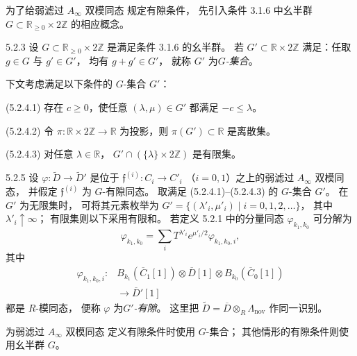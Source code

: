 为了给弱滤过 $A_\infty$ 双模同态
规定有隙条件，
先引入条件 3.1.6 中幺半群
$G\subset\mathbb R_{\geq0}\times2\mathbb Z$
的相应概念。

\begin{definition}{5.2.3}\label{def:5-2-3}
设 $G\subset\mathbb R_{\geq0}\times2\mathbb Z$
是满足条件 3.1.6 的幺半群。
若 $G'\subset\mathbb R\times2\mathbb Z$
满足：任取 $g\in G$ 与 $g'\in G'$，
均有 $g+g'\in G'$，
就称 $G'$ 为\emph{$G$-集合}。
\end{definition}

下文考虑满足以下条件的 $G$-集合 $G'$：
\par\noindent\textup{(5.2.4.1)}\quad
存在 $c\geq0$，使任意
$(\lambda,\mu)\in G'$ 都满足 $-c\leq\lambda$。
\par\noindent\textup{(5.2.4.2)}\quad
令 $\pi:\mathbb R\times2\mathbb Z\to\mathbb R$
为投影，则 $\pi(G')\subset\mathbb R$ 是离散集。
\par\noindent\textup{(5.2.4.3)}\quad
对任意 $\lambda\in\mathbb R$，
$G'\cap(\{\lambda\}\times2\mathbb Z)$
是有限集。

\begin{definition}{5.2.5}\label{def:5-2-5}
设 $\varphi:\widetilde D\to\widetilde D'$
是位于 $\mathfrak f^{(i)}:C_i\to C'_i$
（$i=0,1$）之上的弱滤过 $A_\infty$ 双模同态，
并假定 $\mathfrak f^{(i)}$ 为 $G$-有隙同态。
取满足 (5.2.4.1)--(5.2.4.3) 的
$G$-集合 $G'$。
在 $G'$ 为无限集时，
可将其元素枚举为
$G'=\{(\lambda'_i,\mu'_i)\mid
i=0,1,2,\ldots\}$，
其中 $\lambda'_i\uparrow\infty$；
有限集则以下采用有限和。
若定义 5.2.1 中的分量同态
$\varphi_{k_1,k_0}$
可分解为
\[
\varphi_{k_1,k_0}
=\sum_i T^{\lambda'_i}e^{\mu'_i/2}
\varphi_{k_1,k_0,i},
\]
其中
\[
\begin{aligned}
\varphi_{k_1,k_0,i}:{}
&B_{k_1}(\overline C_1[1])
\otimes\overline D[1]
\otimes B_{k_0}(\overline C_0[1])\\
&\longrightarrow\overline D'[1]
\end{aligned}
\]
都是 $R$-模同态，
便称 $\varphi$ 为\emph{$G'$-有隙}。
这里把
$\widetilde D=\overline D\otimes_R
\Lambda_{\mathrm{nov}}$ 作同一识别。
\end{definition}

为弱滤过 $A_\infty$ 双模同态
定义有隙条件时使用 $G$-集合；
其他情形的有隙条件则使用幺半群 $G$。
